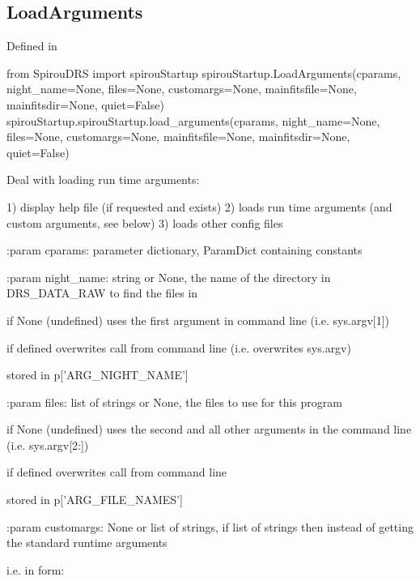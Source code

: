 \noindent\begin{minipage}{\textwidth}
\subsection{LoadArguments}

Defined in \spirouStartup{}

\begin{pythonbox}
from SpirouDRS import spirouStartup
spirouStartup.LoadArguments(cparams, night_name=None, files=None, customargs=None,
                            mainfitsfile=None, mainfitsdir=None, quiet=False)
spirouStartup.spirouStartup.load_arguments(cparams, night_name=None, files=None, customargs=None,
                                           mainfitsfile=None, mainfitsdir=None, quiet=False)
\end{pythonbox}

\begin{pythondocstring}
Deal with loading run time arguments:

1) display help file (if requested and exists)
2) loads run time arguments (and custom arguments, see below)
3) loads other config files

:param cparams: parameter dictionary, ParamDict containing constants

:param night_name: string or None, the name of the directory in DRS_DATA_RAW
                   to find the files in

                   if None (undefined) uses the first argument in command
                   line (i.e. sys.argv[1])

                   if defined overwrites call from
                   command line (i.e. overwrites sys.argv)

                   stored in p['ARG_NIGHT_NAME']

:param files: list of strings or None, the files to use for this program

              if None (undefined) uses the second and all other arguments in
              the command line (i.e. sys.argv[2:])

              if defined overwrites call from command line

              stored in p['ARG_FILE_NAMES']

:param customargs: None or list of strings, if list of strings then instead
                   of getting the standard runtime arguments

       i.e. in form:


\end{pythondocstring}
\end{minipage}

